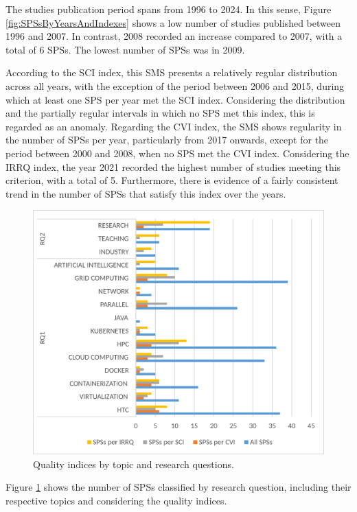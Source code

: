 The studies publication period spans from 1996 to 2024. In this sense, Figure \ref{fig:SPSsByYearsAndIndexes} shows a low number of studies published between 1996 and 2007. In contrast, 2008 recorded an increase compared to 2007, with a total of 6 SPSs. The lowest number of SPSs was in 2009.

According to the SCI index, this SMS presents a relatively regular distribution across all years, with the exception of the period between 2006 and 2015, during which at least one SPS per year met the SCI index. Considering the distribution and the partially regular intervals in which no SPS met this index, this is regarded as an anomaly. Regarding the CVI index, the SMS shows regularity in the number of SPSs per year, particularly from 2017 onwards, except for the period between 2000 and 2008, when no SPS met the CVI index. Considering the IRRQ index, the year 2021 recorded the highest number of studies meeting this criterion, with a total of 5. Furthermore, there is evidence of a fairly consistent trend in the number of SPSs that satisfy this index over the years.

\begin{figure}[htbp]
	\centering
	\includegraphics[scale=0.3]{resources/figures/Imagen5.eps}
	\caption{Quality indices by topic and research questions.}
	\label{fig:IndexesByTopicAndRQs}
\end{figure}

Figure \ref{fig:IndexesByTopicAndRQs} shows the number of SPSs classified by research question, including their respective topics and considering the quality indices.

